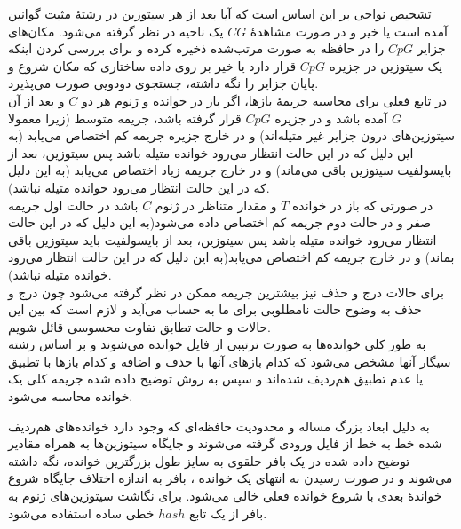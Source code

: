 تشخیص نواحی  بر این اساس است که آیا بعد از هر سیتوزین در رشتهٔ مثبت گوانین آمده است یا خیر و در صورت مشاهدهٔ $CG$ یک ناحیه در نظر گرفته می‌شود. مکان‌های جزایر $CpG$ را در حافظه به صورت مرتب‌شده ذخیره کرده و برای بررسی کردن اینکه یک سیتوزین در جزیره $CpG$ قرار دارد یا خیر بر روی داده ساختاری که مکان شروع و پایان جزایر را نگه داشته‌، جستجوی دودویی صورت می‌پذیرد.
\\
در تابع فعلی برای محاسبه جریمهٔ بازها، اگر باز در خوانده و ژنوم هر دو $C$ و بعد از آن $G$ آمده باشد و در جزیره $CpG$ قرار گرفته باشد، جریمه متوسط (زیرا معمولا سیتوزین‌های درون جزایر غیر متیله‌اند) و در خارج جزیره جریمه کم اختصاص می‌یابد (به این دلیل که در این حالت انتظار می‌رود خوانده متیله باشد پس سیتوزین، بعد از بایسولفیت سیتوزین باقی می‌ماند) و در خارج  جریمه زیاد اختصاص می‌یابد (به این دلیل که در این حالت انتظار می‌رود خوانده متیله نباشد).
\\
در صورتی که باز در خوانده $T$ و مقدار متناظر در ژنوم $C$ باشد در حالت اول جریمه صفر و در حالت دوم جریمه کم اختصاص داده می‌شود(به این دلیل که در این حالت انتظار می‌رود خوانده متیله باشد پس سیتوزین، بعد از بایسولفیت باید سیتوزین باقی بماند) و در خارج  جریمه کم اختصاص می‌یابد(به این دلیل که در این حالت انتظار می‌رود خوانده متیله نباشد).
\\
برای حالات درج و حذف نیز بیشترین جریمه ممکن در نظر گرفته می‌شود چون درج و حذف به وضوح حالت نامطلوبی برای ما به حساب می‌آید و لازم است که بین این حالات و حالت تطابق تفاوت محسوسی قائل شویم.
\\
به طور کلی خوانده‌ها به صورت ترتیبی از فایل خوانده می‌شوند و بر اساس رشته سیگار آنها مشخص می‌شود که کدام بازهای آنها با حذف و اضافه و کدام بازها با تطبیق یا عدم تطبیق هم‌ردیف شده‌اند و سپس به روش توضیح داده شده جریمه‌ کلی یک خوانده محاسبه می‌شود.


به دلیل ابعاد بزرگ مساله و محدودیت حافظه‌ای که وجود دارد خوانده‌های هم‌ردیف شده خط به خط از فایل ورودی گرفته می‌شوند و جایگاه سیتوزین‌ها به همراه مقادیر توضیح داده شده در یک بافر حلقوی به سایز طول بزرگترین خوانده، نگه داشته می‌شوند و در صورت رسیدن به انتهای یک خوانده ، بافر به اندازه اختلاف جایگاه شروع خواندهٔ بعدی با شروع خوانده فعلی خالی می‌شود. برای نگاشت سیتوزین‌های ژنوم به بافر از یک تابع $hash$ خطی ساده استفاده می‌شود.